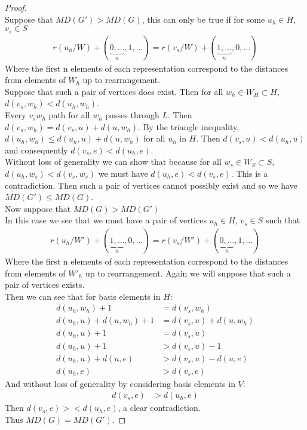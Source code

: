 \documentclass[11pt]{amsart}
\theoremstyle{plain}  %
\theoremstyle{definition}
\theoremstyle{remark}
\numberwithin{equation}{thm}
\begin{document}
\begin{proof}$\ $\\
 Suppose that $MD(G') > MD(G)$, this can only be true if for some $u_h \in H$, $v_s\in S$
\begin{align*}
 r(u_h/W) + (\underbrace{0,\dots}_{n},1,\dots) = r(v_s/W) + (\underbrace{1,\dots}_{n},0,\dots)
\end{align*}
Where the first n elements of each representation correspond to the distances from elements of $W_h$ up to rearrangement.\\
Suppose that such a pair of vertices does exist. Then for all $w_h\in W_H \subset H$,\\ $d(v_s, w_h)<d(u_h, w_h)$.\\
Every $v_sw_h$ path for all $w_h$ passes through $L$. Then $d(v_s, w_h)=d(v_s, u)+ d(u, w_h)$. 
By the triangle inequality, $d(u_h, w_h) \leq d(u_h, u) + d(u, w_h)$ for all $u_h$ in $H$.
Then $d(v_s, u)<d(u_h,u)$ and consequently $d(v_s, e)<d(u_h, e)$.\\
Without loss of generality we can show that because for all $w_s\in W_S\subset S$, $d(u_h, w_s)<d(v_s, w_s)$ we must have
$d(u_h, e)<d(v_s,e)$. This is a contradiction. Then such a pair of vertices cannot possibly exist and so we have $MD(G') \leq MD(G)$.\\
Now suppose that $MD(G) > MD(G')$\\
In this case we see that we must have a pair of vertices $u_h \in H$, $v_s\in S$ such that
\begin{align*}
 r(u_h/W') + (\underbrace{1,\dots}_{n},0,\dots) = r(v_s/W') + (\underbrace{0,\dots}_{n},1,\dots)
\end{align*}
Where the first n elements of each representation correspond to the distances from elements of $W'_h$ up to rearrangement. 
Again we will suppose that such a pair of vertices exists.\\ 
Then we can see that for basis elements in $H$:
\begin{align*}
d(u_h, w_h) + 1 &= d(v_s,w_h)\\
d(u_h, u) + d(u, w_h) + 1 &= d(v_s, u) + d(u, w_h)\\
d(u_h, u) + 1 &= d(v_s, u)\\
d(u_h, u) + 1 &> d(v_s, u) - 1\\
d(u_h, u) + d(u, e) &> d(v_s, u) - d(u, e)\\
d(u_h, e) &> d(v_s, e)
\end{align*}
And without loss of generality by considering basis elements in $V$:
\begin{align*}
 d(v_s, e) &> d(u_h, e)
\end{align*}
Then $d(v_s, e) >< d(u_h, e)$, a clear contradiction.\\
Thus $MD(G)=MD(G')$.
\end{proof}
\end{document}
